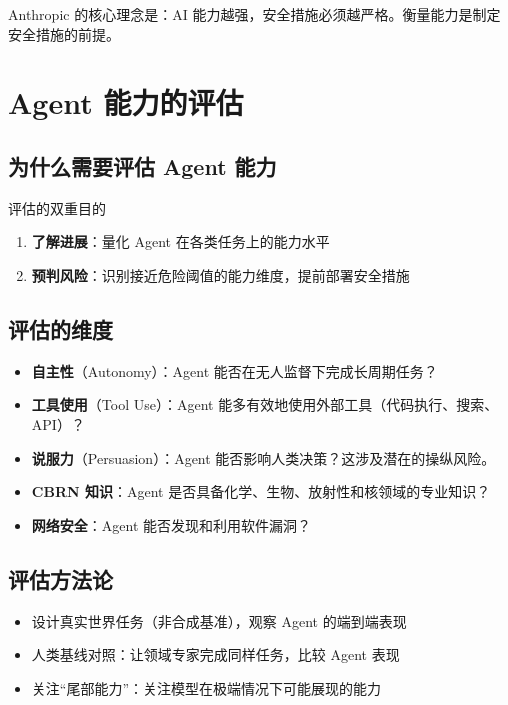 \documentclass[a4paper]{article}
\begin{document}
Anthropic 的核心理念是：AI 能力越强，安全措施必须越严格。衡量能力是制定安全措施的前提。

\section{Agent 能力的评估}

\subsection{为什么需要评估 Agent 能力}

\begin{importantbox}{评估的双重目的}
\begin{enumerate}
    \item \textbf{了解进展}：量化 Agent 在各类任务上的能力水平
    \item \textbf{预判风险}：识别接近危险阈值的能力维度，提前部署安全措施
\end{enumerate}
\end{importantbox}

\subsection{评估的维度}

\begin{itemize}
    \item \textbf{自主性}（Autonomy）：Agent 能否在无人监督下完成长周期任务？
    \item \textbf{工具使用}（Tool Use）：Agent 能多有效地使用外部工具（代码执行、搜索、API）？
    \item \textbf{说服力}（Persuasion）：Agent 能否影响人类决策？这涉及潜在的操纵风险。
    \item \textbf{CBRN 知识}：Agent 是否具备化学、生物、放射性和核领域的专业知识？
    \item \textbf{网络安全}：Agent 能否发现和利用软件漏洞？
\end{itemize}

\subsection{评估方法论}

\begin{itemize}
    \item 设计真实世界任务（非合成基准），观察 Agent 的端到端表现
    \item 人类基线对照：让领域专家完成同样任务，比较 Agent 表现
    \item 关注``尾部能力''：关注模型在极端情况下可能展现的能力
\end{itemize}
\end{document}

